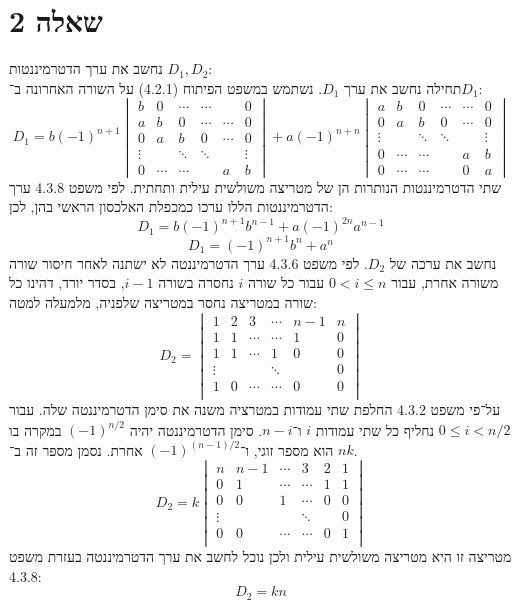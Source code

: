 \documentclass[a4paper,10pt]{article}
\begin{document}
	\section{שאלה 2}
	נחשב את ערך הדטרמיננטות $D_1, D_2$: \\
	תחילה נחשב את ערך $D_1$.
	נשתמש במשפט הפיתוח (4.2.1) על השורה האחרונה ב־$D_1$:
	\[
		D_1 = 
		b {(-1)}^{n + 1} \begin{vmatrix}
			b & 0 & \cdots & \cdots & & 0 \\
			a & b & 0 & \cdots & \cdots & 0 \\
			0 & a & b & 0 & \cdots & 0 \\
			\vdots & & \ddots & \ddots & & \vdots \\
			0 & \cdots & \cdots & & a & b
		\end{vmatrix}
		+
		a {(-1)}^{n + n} \begin{vmatrix}
			a & b & 0 & \cdots & \cdots & 0 \\
			0 & a & b & 0 & \cdots & 0 \\
			\vdots & & \ddots & \ddots & & \vdots \\
			0 & \cdots & \cdots & & a & b \\
			0 & \cdots & \cdots & & 0 & a
		\end{vmatrix}
	\]
	שתי הדטרמיננטות הנותרות הן של מטריצה משולשית עילית ותחתית.
	לפי משפט 4.3.8 ערך הדטרמיננטות הללו ערכו כמכפלת האלכסון הראשי בהן, לכן:
	\[
		D_1 = 
		b{(-1)}^{n + 1} b^{n - 1} + a {(-1)}^{2n} a^{n - 1}
	\] \[
		D_1 = {(-1)}^{n + 1} b^n + a^n
	\]
	נחשב את ערכה של $D_2$.
	לפי משפט 4.3.6 ערך הדטרמיננטה לא ישתנה לאחר חיסור שורה משורה אחרת,
	עבור $0 < i \le n$ עבור כל שורה $i$ נחסרה בשורה $i - 1$, בסדר יורד,
	דהינו כל שורה במטריצה נחסר במטריצה שלפניה, מלמעלה למטה:
	\[
		D_2 =
		\begin{vmatrix}
			1 & 2 & 3 & \cdots & n - 1 & n \\
			1 & 1 & \cdots & \cdots & 1 & 0 \\
			1 & 1 & \cdots & 1 & 0 & 0 \\
			\vdots & & & \ddots & & 0 \\
			1 & 0 & \cdots & \cdots & 0 & 0 \\
		\end{vmatrix}
	\]
על־פי משפט 4.3.2 החלפת שתי עמודות במטרציה משנה את סימן הדטרמיננטה שלה.
עבור $0 \le i < n / 2$ נחליף כל שתי עמודות $i$ ו־$n - i$.
סימן הדטרמיננטה יהיה ${(-1)}^{n / 2}$ במקרה בו $n$ הוא מספר זוגי,
ו־${(-1)}^{(n - 1) / 2}$ אחרת. נסמן מספר זה ב־$k$.
\[
		D_2 = k
		\begin{vmatrix}
			n & n - 1 & \cdots & 3 & 2 & 1 \\
			0 & 1 & \cdots & \cdots & 1 & 1 \\
			0 & 0 & 1 & \cdots & 0 & 0 \\
			\vdots & & & \ddots & & 0 \\
			0 & 0 & \cdots & \cdots & 0 & 1 \\
		\end{vmatrix}
	\]
	מטריצה זו היא מטריצה משולשית עילית ולכן נוכל לחשב את ערך הדטרמיננטה בעזרת משפט 4.3.8:
	\[
		D_2 = k n
	\]
\end{document}
